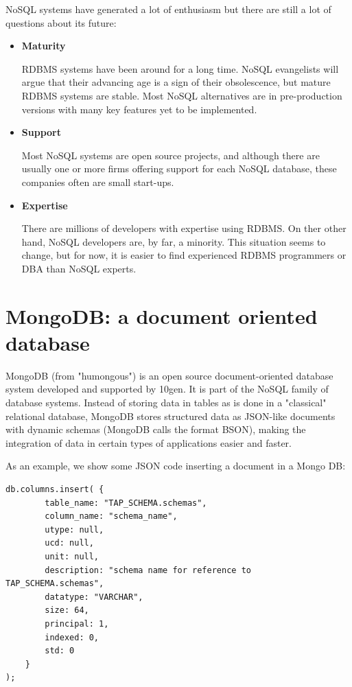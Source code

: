 NoSQL systems have generated a lot of enthusiasm but there are still a lot of questions about its future:

\begin{itemize}

\item \textbf{Maturity}

RDBMS systems have been around for a long time. NoSQL evangelists will argue that their advancing age is a sign of their obsolescence, but mature RDBMS systems are stable. Most NoSQL alternatives are in pre-production versions with many key features yet to be implemented.

\item \textbf{Support}

Most NoSQL systems are open source projects, and although there are usually one or more firms offering support for each NoSQL database, these companies often are small start-ups.

\item \textbf{Expertise}

There are millions of developers with expertise using RDBMS. On ther other hand, NoSQL developers are, by far, a minority. This situation seems to change, but for now, it is easier to find experienced RDBMS programmers or DBA than NoSQL experts.

\end{itemize}

\section{MongoDB: a document oriented database}

MongoDB (from "humongous") is an open source document-oriented database system developed and supported by 10gen. It is part of the NoSQL family of database systems. Instead of storing data in tables as is done in a "classical" relational database, MongoDB stores structured data as JSON-like documents with dynamic schemas (MongoDB calls the format BSON), making the integration of data in certain types of applications easier and faster. 

As an example, we show some JSON code inserting a document in a Mongo DB:
\begin{lstlisting}
db.columns.insert( {
		table_name: "TAP_SCHEMA.schemas",
		column_name: "schema_name",
		utype: null,
		ucd: null,
		unit: null,
		description: "schema name for reference to TAP_SCHEMA.schemas",
		datatype: "VARCHAR",
		size: 64,
		principal: 1,
		indexed: 0,
		std: 0
	}
);
\end{lstlisting} 


